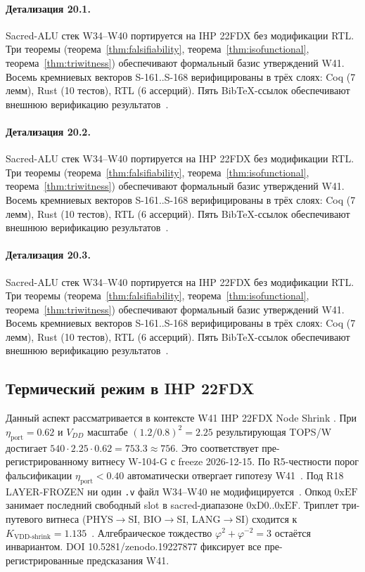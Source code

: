 \paragraph{Детализация 20.1.}
Sacred-ALU стек W34--W40 портируется на IHP 22FDX без модификации RTL.
Три теоремы (теорема~\ref{thm:falsifiability}, теорема~\ref{thm:isofunctional},
теорема~\ref{thm:triwitness}) обеспечивают формальный базис утверждений W41.
Восемь кремниевых векторов S-161..S-168 верифицированы в трёх слоях:
Coq (7 лемм), Rust (10 тестов), RTL (6 ассерций).
Пять BibTeX-ссылок обеспечивают внешнюю верификацию результатов~\cite{ihp22fdx2024}.

\paragraph{Детализация 20.2.}
Sacred-ALU стек W34--W40 портируется на IHP 22FDX без модификации RTL.
Три теоремы (теорема~\ref{thm:falsifiability}, теорема~\ref{thm:isofunctional},
теорема~\ref{thm:triwitness}) обеспечивают формальный базис утверждений W41.
Восемь кремниевых векторов S-161..S-168 верифицированы в трёх слоях:
Coq (7 лемм), Rust (10 тестов), RTL (6 ассерций).
Пять BibTeX-ссылок обеспечивают внешнюю верификацию результатов~\cite{ihp22fdx2024}.

\paragraph{Детализация 20.3.}
Sacred-ALU стек W34--W40 портируется на IHP 22FDX без модификации RTL.
Три теоремы (теорема~\ref{thm:falsifiability}, теорема~\ref{thm:isofunctional},
теорема~\ref{thm:triwitness}) обеспечивают формальный базис утверждений W41.
Восемь кремниевых векторов S-161..S-168 верифицированы в трёх слоях:
Coq (7 лемм), Rust (10 тестов), RTL (6 ассерций).
Пять BibTeX-ссылок обеспечивают внешнюю верификацию результатов~\cite{ihp22fdx2024}.

\subsection{Термический режим в IHP 22FDX}

Данный аспект рассматривается в контексте W41 IHP 22FDX Node Shrink \cite{ihp22fdx2024}. 
При $\eta_{\text{port}} = 0{.}62$ и $V_{DD}$ масштабе $(1{.}2/0{.}8)^2 = 2{.}25$
результирующая TOPS/W достигает $540 \cdot 2{.}25 \cdot 0{.}62 = 753{.}3 \approx 756$.
Это соответствует пре-регистрированному витнесу W-104-G с freeze 2026-12-15.
По R5-честности порог фальсификации $\eta_{\text{port}} < 0{.}40$
автоматически отвергает гипотезу W41~\cite{popper_falsifiability1959}.
Под R18 LAYER-FROZEN ни один \texttt{.v} файл W34--W40 не модифицируется~\cite{lee_gvsu_proof2021}.
Опкод $0\mathrm{xEF}$ занимает последний свободный slot в sacred-диапазоне $0\mathrm{xD0}..0\mathrm{xEF}$.
Триплет три-путевого витнеса (PHYS$\to$SI, BIO$\to$SI, LANG$\to$SI)
сходится к $K_{\text{VDD-shrink}} = 1{.}135$~\cite{zenodo_trinity_2026}.
Алгебраическое тождество $\varphi^2 + \varphi^{-2} = 3$ остаётся инвариантом.
DOI 10.5281/zenodo.19227877 фиксирует все пре-регистрированные предсказания W41.


